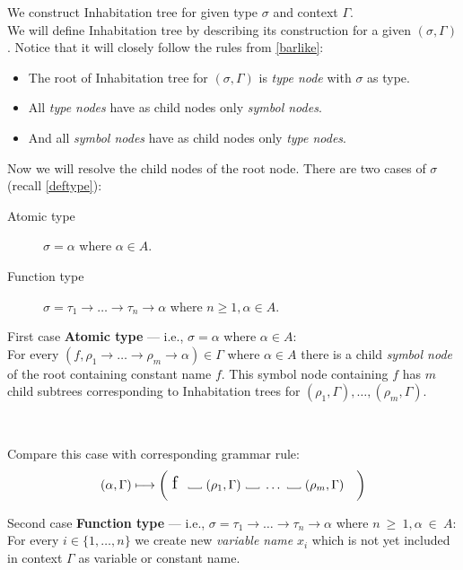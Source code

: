 \documentclass[12pt,a4paper]{report}
\newcommand\Vtextvisiblespace[1][.3em]{%
  \mbox{\kern.06em\vrule height.3ex}%
  \vbox{\hrule width#1}%
  \hbox{\vrule height.3ex}}
\begin{document}
We construct Inhabitation tree for given type $\sigma$ and context $\Gamma$.\\
We will define Inhabitation tree by describing its construction for a given $(\sigma,\Gamma)$.
Notice that it will closely follow the rules from \ref{barlike}:

\begin{itemize}
\item The root of Inhabitation tree for $(\sigma,\Gamma)$ is 
      \textit{type node} with $\sigma$ as type.
\item All \textit{type nodes} have as child nodes only \textit{symbol nodes}. 
\item And all \textit{symbol nodes} have as child nodes only \textit{type nodes}. 
\end{itemize}

\begin{samepage}
Now we will resolve the child nodes of the root node.
There are two cases of $\sigma$ (recall \ref{deftype}): 
\begin{description}
	\item[Atomic type] 
		$\sigma = \alpha $ where $\alpha \in A$. 
	\item[Function type] 
		$\sigma = \tau_1 \rightarrow \dots \rightarrow \tau_n \rightarrow \alpha$
		where $n \geq 1, \alpha \in A$.
\end{description}
\end{samepage}


First case \textbf{Atomic type} --- i.e., $\sigma = \alpha$ where $\alpha \in A$:\\
For every $(f,\rho_1 \rightarrow \dots \rightarrow \rho_m \rightarrow \alpha) \in \Gamma$
where $\alpha \in A$ there is a child \textit{symbol node} of the root containing constant name $f$.
This symbol node containing $f$ has $m$ child subtrees corresponding to Inhabitation trees for 
$(\rho_1,\Gamma),\dots,(\rho_m,\Gamma)$.   

~

Compare this case with corresponding grammar rule:
\[ 
	( \alpha , \Gamma )  \gar
	\bigg( \mbox{ {\Large f }}
	  \mbox{ \Vtextvisiblespace[1em] } 
	  ( \rho_1 , \Gamma )
	  \mbox{ \Vtextvisiblespace[1em] } 
	  \dots
	  \mbox{ \Vtextvisiblespace[1em] } 
	  ( \rho_m , \Gamma )
	  \quad \bigg)
\]

Second case \textbf{Function type} --- i.e., 
$\sigma = \tau_1 \rightarrow \dots \rightarrow \tau_n \rightarrow \alpha$
where $n~\geq~1, \alpha~\in~A$:\\
For every  $i \in \{1,\dots,n\}$ we create new \textit{variable name} $x_i$ which is not yet included in context $\Gamma$ as variable or constant name.
 
\end{document}

